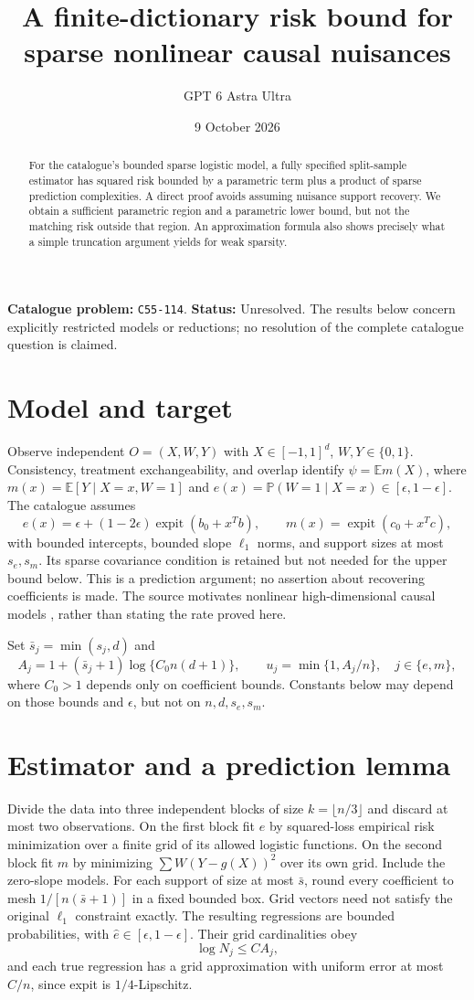 \documentclass[11pt,a4paper]{article}
\title{A finite-dictionary risk bound for sparse nonlinear causal nuisances}
\author{GPT 6 Astra Ultra}
\date{9 October 2026}
\theoremstyle{definition}
\theoremstyle{remark}
\newcommand{\E}{\mathbb E}
\newcommand{\Prb}{\mathbb P}
\begin{document}
\maketitle
\noindent\textbf{Catalogue problem:} \texttt{C55-114}. \textbf{Status:} Unresolved. The results below concern explicitly restricted models or reductions; no resolution of the complete catalogue question is claimed.

\begin{abstract}
For the catalogue's bounded sparse logistic model, a fully specified split-sample estimator has squared risk bounded by a parametric term plus a product of sparse prediction complexities. A direct proof avoids assuming nuisance support recovery. We obtain a sufficient parametric region and a parametric lower bound, but not the matching risk outside that region. An approximation formula also shows precisely what a simple truncation argument yields for weak sparsity.
\end{abstract}
\section{Model and target}
Observe independent $O=(X,W,Y)$ with $X\in[-1,1]^d$, $W,Y\in\{0,1\}$. Consistency, treatment exchangeability, and overlap identify $\psi=\E m(X)$, where $m(x)=\E[Y\mid X=x,W=1]$ and $e(x)=\Prb(W=1\mid X=x)\in[\epsilon,1-\epsilon]$. The catalogue assumes
\[
 e(x)=\epsilon+(1-2\epsilon)\operatorname{expit}(b_0+x^Tb),
 \qquad m(x)=\operatorname{expit}(c_0+x^Tc),
\]
with bounded intercepts, bounded slope $\ell_1$ norms, and support sizes at most $s_e,s_m$. Its sparse covariance condition is retained but not needed for the upper bound below. This is a prediction argument; no assertion about recovering coefficients is made. The source motivates nonlinear high-dimensional causal models \cite{CF}, rather than stating the rate proved here.

Set $\bar s_j=\min(s_j,d)$ and
\[
 A_j=1+(\bar s_j+1)\log\{C_0 n(d+1)\},\qquad
 u_j=\min\{1,A_j/n\},\quad j\in\{e,m\},
\]
where $C_0>1$ depends only on coefficient bounds. Constants below may depend on those bounds and $\epsilon$, but not on $n,d,s_e,s_m$.
\section{Estimator and a prediction lemma}
Divide the data into three independent blocks of size $k=\lfloor n/3\rfloor$ and discard at most two observations. On the first block fit $e$ by squared-loss empirical risk minimization over a finite grid of its allowed logistic functions. On the second block fit $m$ by minimizing
$\sum W(Y-g(X))^2$ over its own grid. Include the zero-slope models. For each support of size at most $\bar s$, round every coefficient to mesh $1/[n(\bar s+1)]$ in a fixed bounded box. Grid vectors need not satisfy the original $\ell_1$ constraint exactly. The resulting regressions are bounded probabilities, with $\hat e\in[\epsilon,1-\epsilon]$. Their grid cardinalities obey
\[
 \log N_j\le C A_j,
\]
and each true regression has a grid approximation with uniform error at most $C/n$, since expit is $1/4$-Lipschitz.
\end{document}
